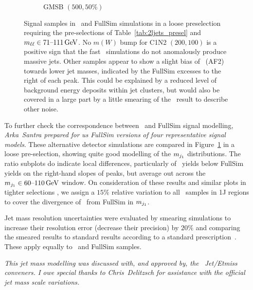 \begin{figure}[tp]
\begin{subfigure}{0.48\textwidth}
\caption{GMSB $(500, 50\%)$}
\end{subfigure}
\caption[
Signal samples in \afii\ and FullSim simulations in a loose preselection
]{%
Signal samples in \afii\ and FullSim simulations in a loose preselection
requiring the pre-selections of Table~\ref{tab:2ljets_presel} and
$\mll \in 71\textrm{--}111\,\eV[G]$.
No $m(W)$ bump for C1N2 $(200, 100)$ is a positive sign that the fast \afii\
simulations do not anomalously produce massive jets.
Other samples appear to show a slight bias of \afii\ (AF2) towards lower jet
masses, indicated by the FullSim excesses to the right of each peak.
This could be explained by a reduced level of background energy deposits within
jet clusters, but would also be covered in a large part by a little smearing of
the \afii\ result to describe other noise.
}
\label{fig:2ljets_jetm_afii_fullsim}
\end{figure}

To further check the correspondence between \afii\ and FullSim signal modelling,
\emph{Arka~Santra prepared for us FullSim versions of four representative
signal models}.
These alternative detector simulations are compared in
Figure~\ref{fig:2ljets_jetm_afii_fullsim} in a loose pre-selection,
showing quite good modelling of the $\mjetone$ distributions.
The ratio subplots do indicate local differences, particularly of \afii\ yields
below FullSim yields on the right-hand slopes of peaks, but average out
across the $\mjetone \in 60\textrm{--}110\,\eV[G]$ window.
On consideration of these results and similar plots in tighter selections ,
we assign a $15\%$ relative variation to all \afii\ samples in 1J regions
to cover the divergence of \afii\ from FullSim in $\mjetone$.

Jet mass resolution uncertainties were evaluated by smearing simulations
to increase their resolution error (decrease their precision) by $20\%$
and comparing the smeared results to standard results according to a standard
prescription~\cite{atlas_twiki_jmr}.
These apply equally to \afii\ and FullSim samples.

\emph{This jet mass modelling was discussed with, and approved by, the \atlas\
Jet/Etmiss conveners. I owe special thanks to Chris~Delitzsch for assistance
with the official jet mass scale variations.}


